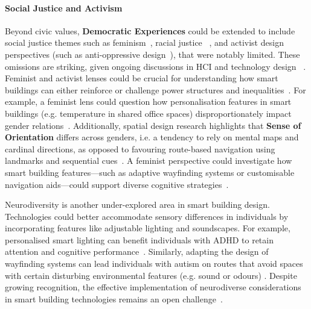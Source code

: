 \paragraph{Social Justice and Activism} 
Beyond civic values, \textbf{Democratic Experiences} could be extended to include social justice themes such as feminism~\cite{mitchell2020human}, racial justice ~\cite{corbett2019engaging}, and activist design perspectives (such as anti-oppressive design~\cite{fox2016exploring}), that were notably limited. These omissions are striking, given ongoing discussions in HCI and technology design ~\cite{chordia2024social}. Feminist and activist lenses could be crucial for understanding how smart buildings can either reinforce or challenge power structures and inequalities~\cite{mitchell2020human}. For example, a feminist lens could question how personalisation features in smart buildings (e.g. temperature in shared office spaces) disproportionately impact gender relations~\cite{boys10there}. Additionally, spatial design research  highlights that \textbf{Sense of Orientation} differs across genders, i.e. a tendency to rely on mental maps and cardinal directions, as opposed to favouring route-based navigation using landmarks and sequential cues~\cite{munion2019gender}. A feminist perspective could investigate how smart building features---such as adaptive wayfinding systems or customisable navigation aids---could support diverse cognitive strategies~\cite{kutlu2005sense, coluccia2004gender}.

Neurodiversity is another under-explored area in smart building design. Technologies could better accommodate sensory differences in individuals by incorporating features like adjustable lighting and soundscapes. For example, personalised smart lighting can benefit individuals with ADHD to retain attention and cognitive performance~\cite{bagheri2024visual}. Similarly, adapting the design of wayfinding systems can lead individuals with autism on routes that avoid spaces with certain disturbing environmental features (e.g. sound or odours) \cite{black2022considerations}. Despite growing recognition, the effective implementation of neurodiverse considerations in smart building technologies remains an open challenge~\cite{bagheri2024visual, bruyere2022neurodiversity, kwon2023interior}.

